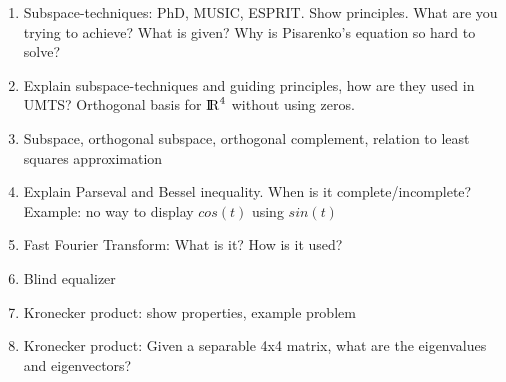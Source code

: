 \documentclass{article}
\begin{document}
\begin{enumerate}
    \item Subspace-techniques: PhD, MUSIC, ESPRIT. Show principles. What are you trying to achieve? What is given? Why is Pisarenko's equation so hard to solve?
    \item Explain subspace-techniques and guiding principles, how are they used in UMTS? Orthogonal basis for ${\rm I\!R}^4$ without using zeros. 
    \item Subspace, orthogonal subspace, orthogonal complement, relation to least squares approximation
    \item Explain Parseval and Bessel inequality. When is it complete/incomplete? Example: no way to display $cos(t)$ using $sin(t)$
    \item Fast Fourier Transform: What is it? How is it used?
    \item Blind equalizer
    \item Kronecker product: show properties, example problem
    \item Kronecker product: Given a separable 4x4 matrix, what are the eigenvalues and eigenvectors?
    
\end{enumerate}
\end{document}
